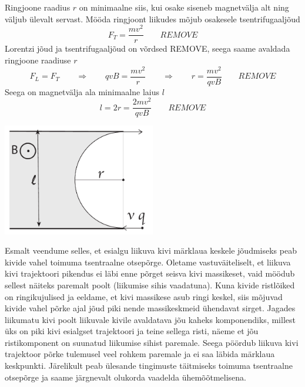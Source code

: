 \documentclass[10pt]{article}
\newcommand{\pp}[1]{REMOVE}
\begin{document}
Ringjoone raadius $r$ on minimaalne siis, kui osake siseneb magnetvälja alt ning väljub ülevalt servast. Mööda ringjoont liikudes mõjub osakesele tsentrifugaaljõud
\[ F_T = \frac{mv^2}{r} \quad\quad\pp{1} \]
Lorentzi jõud ja tsentrifugaaljõud on võrdsed \pp{1}, seega saame avaldada ringjoone raadiuse $r$
\[ F_L = F_T \quad\quad\Rightarrow\quad\quad qvB = \frac{mv^2}{r} \quad\quad\Rightarrow\quad\quad r = \frac{mv^2}{qvB} \quad\quad\pp{2}\]
Seega on magnetvälja ala minimaalne laius $l$
\[ l = 2r = \frac{2mv^2}{qvB} \quad\quad\pp{1} \]

 \vspace{-20pt}
  \begin{center}
    \includegraphics[width=0.5\textwidth]{2019-v2g-05-yl.pdf}
  \end{center}
  \vspace{-20pt}
\probend
\bigskip

\setAuthor{}

\solu
Esmalt veendume selles, et esialgu liikuva kivi märklaua keskele jõudmiseks peab kivide vahel toimuma tsentraalne otsepõrge. Oletame vastuväiteliselt, et liikuva kivi trajektoori pikendus ei läbi enne põrget seisva kivi massikeset, vaid möödub sellest näiteks paremalt poolt (liikumise sihis vaadatuna). Kuna kivide ristlõiked on ringikujulised ja eeldame, et kivi massikese asub ringi keskel, siis mõjuvad kivide vahel põrke ajal jõud piki nende massikeskmeid ühendavat sirget. Jagades liikumatu kivi poolt liikuvale kivile avaldatava jõu kaheks komponendiks, millest üks on piki kivi esialgset trajektoori ja teine sellega risti, näeme et jõu ristikomponent on suunatud liikumise sihist paremale. Seega pöördub liikuva kivi trajektoor põrke tulemusel veel rohkem paremale ja ei saa läbida märklaua keskpunkti. Järelikult peab ülesande tingimuste täitmiseks toimuma tsentraalne otsepõrge ja saame järgnevalt olukorda vaadelda ühemõõtmelisena.
\end{document}
